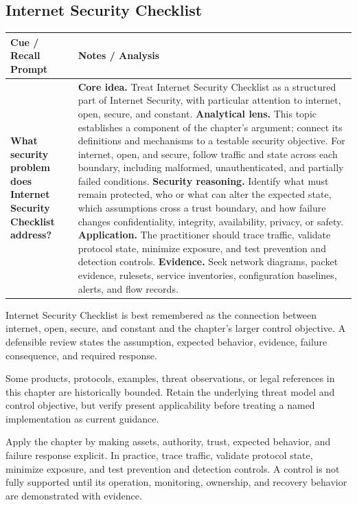 \documentclass[11pt]{article}
\newcommand{\CornellHeader}{%
\rowcolor{Navy}\color{white}\bfseries Cue / Recall Prompt & \color{white}\bfseries Notes / Analysis\\\hline}
\newcommand{\CornellRow}[2]{%
\cellcolor{CueGray}\RaggedRight\textbf{#1} & \RaggedRight #2\\\hline}
\begin{document}
\subsection*{Internet Security Checklist}
\begin{longtable}{>{\RaggedRight\arraybackslash}p{}|>{\RaggedRight\arraybackslash}p{}}
\CornellHeader
\CornellRow{What security problem does Internet Security Checklist address?}{\textbf{Core idea.} Treat Internet Security Checklist as a structured part of Internet Security, with particular attention to internet, open, secure, and constant. \textbf{Analytical lens.} This topic establishes a component of the chapter's argument; connect its definitions and mechanisms to a testable security objective. For internet, open, and secure, follow traffic and state across each boundary, including malformed, unauthenticated, and partially failed conditions. \textbf{Security reasoning.} Identify what must remain protected, who or what can alter the expected state, which assumptions cross a trust boundary, and how failure changes confidentiality, integrity, availability, privacy, or safety. \textbf{Application.} The practitioner should trace traffic, validate protocol state, minimize exposure, and test prevention and detection controls. \textbf{Evidence.} Seek network diagrams, packet evidence, rulesets, service inventories, configuration baselines, alerts, and flow records.}
\end{longtable}
\begin{topicsummary}
Internet Security Checklist is best remembered as the connection between internet, open, secure, and constant and the chapter's larger control objective. A defensible review states the assumption, expected behavior, evidence, failure consequence, and required response.
\end{topicsummary}
\begin{historybox}
Some products, protocols, examples, threat observations, or legal references in this chapter are historically bounded. Retain the underlying threat model and control objective, but verify present applicability before treating a named implementation as current guidance.
\end{historybox}
\begin{defensebox}
Apply the chapter by making assets, authority, trust, expected behavior, and failure response explicit. In practice, trace traffic, validate protocol state, minimize exposure, and test prevention and detection controls. A control is not fully supported until its operation, monitoring, ownership, and recovery behavior are demonstrated with evidence.
\end{defensebox}
\end{document}
